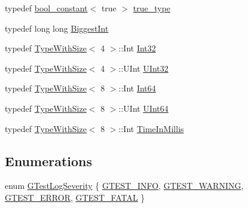 \begin{DoxyCompactItemize}
\item 
typedef \mbox{\hyperlink{structtesting_1_1internal_1_1bool__constant}{bool\+\_\+constant}}$<$ true $>$ \mbox{\hyperlink{namespacetesting_1_1internal_a62f917c3424d8841de9b49b5ec28edb4}{true\+\_\+type}}
\item 
typedef long long \mbox{\hyperlink{namespacetesting_1_1internal_a05c6bd9ede5ccdf25191a590d610dcc6}{Biggest\+Int}}
\item 
typedef \mbox{\hyperlink{classtesting_1_1internal_1_1_type_with_size}{Type\+With\+Size}}$<$ 4 $>$\+::Int \mbox{\hyperlink{namespacetesting_1_1internal_a8ee38faaf875f133358abaf9bc056cec}{Int32}}
\item 
typedef \mbox{\hyperlink{classtesting_1_1internal_1_1_type_with_size}{Type\+With\+Size}}$<$ 4 $>$\+::U\+Int \mbox{\hyperlink{namespacetesting_1_1internal_a40d4fffcd2bf56f18b1c380615aa85e3}{U\+Int32}}
\item 
typedef \mbox{\hyperlink{classtesting_1_1internal_1_1_type_with_size}{Type\+With\+Size}}$<$ 8 $>$\+::Int \mbox{\hyperlink{namespacetesting_1_1internal_a271c563fec38b804ddab0677f51f70a8}{Int64}}
\item 
typedef \mbox{\hyperlink{classtesting_1_1internal_1_1_type_with_size}{Type\+With\+Size}}$<$ 8 $>$\+::U\+Int \mbox{\hyperlink{namespacetesting_1_1internal_aa6a1ac454e6d7e550fa4925c62c35caa}{U\+Int64}}
\item 
typedef \mbox{\hyperlink{classtesting_1_1internal_1_1_type_with_size}{Type\+With\+Size}}$<$ 8 $>$\+::Int \mbox{\hyperlink{namespacetesting_1_1internal_a66a845df404b38fe85c5e14a069f255a}{Time\+In\+Millis}}
\end{DoxyCompactItemize}
\subsection*{Enumerations}
\begin{DoxyCompactItemize}
\item 
enum \mbox{\hyperlink{namespacetesting_1_1internal_aa6255ef3b023c5b4e1a2198d887fb977}{G\+Test\+Log\+Severity}} \{ \mbox{\hyperlink{namespacetesting_1_1internal_aa6255ef3b023c5b4e1a2198d887fb977aff315e0913fcda86fe4de882bf5e33e9}{G\+T\+E\+S\+T\+\_\+\+I\+N\+FO}}, 
\mbox{\hyperlink{namespacetesting_1_1internal_aa6255ef3b023c5b4e1a2198d887fb977a7a051bc2794f15a4bf0eab40562a304c}{G\+T\+E\+S\+T\+\_\+\+W\+A\+R\+N\+I\+NG}}, 
\mbox{\hyperlink{namespacetesting_1_1internal_aa6255ef3b023c5b4e1a2198d887fb977a651e9cd2a904e0c8210536271b875f75}{G\+T\+E\+S\+T\+\_\+\+E\+R\+R\+OR}}, 
\mbox{\hyperlink{namespacetesting_1_1internal_aa6255ef3b023c5b4e1a2198d887fb977a75063567740f6bf7da419b1b9197b12e}{G\+T\+E\+S\+T\+\_\+\+F\+A\+T\+AL}}
 \}
\end{DoxyCompactItemize}
